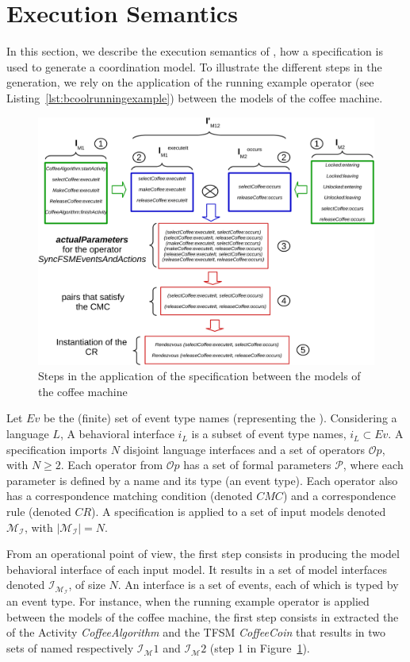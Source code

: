 \section{Execution Semantics}
In this section, we describe the execution semantics of \bcool, \ie how a \bcool specification is used to generate a coordination model. To illustrate the different steps in the generation, we rely on the application of the running example operator (see Listing~\ref{lst:bcoolrunningexample}) between the models of the coffee machine.

\begin{figure} [h]
	\center
	\includegraphics[width=.9\textwidth]{bcool/figs/semantics}
	\caption{Steps in the application of the \bcool specification between the models of the coffee machine}
	\label{fig:semantics}
\end{figure}

Let $Ev$ be the (finite) set of event type names (representing the \dse). Considering a language $L$, A behavioral interface $i_L$ is a subset of event type names, $i_L \subset Ev$. A \bcool specification imports $N$ disjoint language interfaces and a set of operators $\mathcal{O}p$, with $N\geq 2$. Each operator from $\mathcal{O}p$ has a set of formal parameters $\mathcal{P}$, where each parameter is defined by a name and its type (\ie an event type). Each operator also has a correspondence matching condition (denoted $CMC$) and a correspondence rule (denoted $CR$). A \bcool specification is applied to a set of input models denoted $\mathcal{M_I}$, with $|\mathcal{M_I}| = N$.

From an operational point of view, the first step consists in producing the model behavioral interface of each input model. It results in a set of model interfaces denoted $\mathcal{I_{M_I}}$, of size $N$. An interface is a set of events, each of which is typed by an event type. For instance, when the running example operator is applied between the models of the coffee machine, the first step consists in extracted the \mse of the Activity \emph{CoffeeAlgorithm} and the TFSM \emph{CoffeeCoin} that results in two sets of \mse named respectively $\mathcal{I_M}{1}$ and $\mathcal{I_M}{2}$ (step 1 in Figure~\ref{fig:semantics}).

